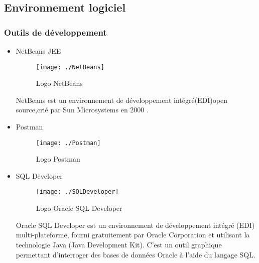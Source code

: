 \subsection{Environnement logiciel}
\subsubsection{Outils de développement}
\begin{itemize}
\item NetBeans JEE\\

\begin{figure}[!h]
\begin{center}
\texttt{[image: ./NetBeans]}

\caption{Logo NetBeans}
\end{center}
\end{figure}

NetBeans est un environnement de développement intégré(EDI)open source,crié par Sun Microsystems en 2000 \cite{cite1}.

\item Postman


\begin{figure}[!h]
\begin{center}

\texttt{[image: ./Postman]}

\caption{Logo Postman}
\end{center}
\end{figure}


\item SQL Developer


\begin{figure}[!h]
\begin{center}

\texttt{[image: ./SQLDeveloper]}

\caption{Logo Oracle SQL Developer}
\end{center}
\end{figure}



Oracle SQL Developer est un environnement de développement intégré (EDI) multi-plateforme, fourni gratuitement par Oracle Corporation et utilisant la technologie Java (Java Development Kit). C'est un outil graphique permettant d'interroger des bases de données Oracle à l'aide du langage SQL.

\end{itemize}

